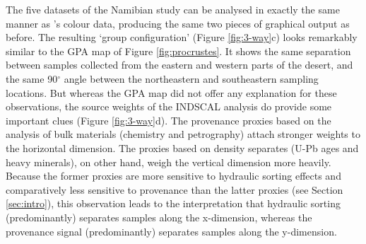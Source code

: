 \documentclass{article}
\begin{document}
The five datasets of the Namibian study can be analysed in exactly the
same manner as \citet{helm1964}'s colour data, producing the same two
pieces of graphical output as before. The resulting `group
configuration' (Figure \ref{fig:3-way}c) looks remarkably similar to
the GPA map of Figure \ref{fig:procrustes}. It shows the same
separation between samples collected from the eastern and western
parts of the desert, and the same 90$^\circ$ angle between the
northeastern and southeastern sampling locations. But whereas the GPA
map did not offer any explanation for these observations, the source
weights of the INDSCAL analysis do provide some important clues
(Figure \ref{fig:3-way}d). The provenance proxies based on the
analysis of bulk materials (chemistry and petrography) attach stronger
weights to the horizontal dimension. The proxies based on density
separates (U-Pb ages and heavy minerals), on other hand, weigh the
vertical dimension more heavily.  Because the former proxies are more
sensitive to hydraulic sorting effects and comparatively less
sensitive to provenance than the latter proxies (see Section
\ref{sec:intro}), this observation leads to the interpretation that
hydraulic sorting (predominantly) separates samples along the
x-dimension, whereas the provenance signal (predominantly) separates
samples along the y-dimension.
\end{document}
